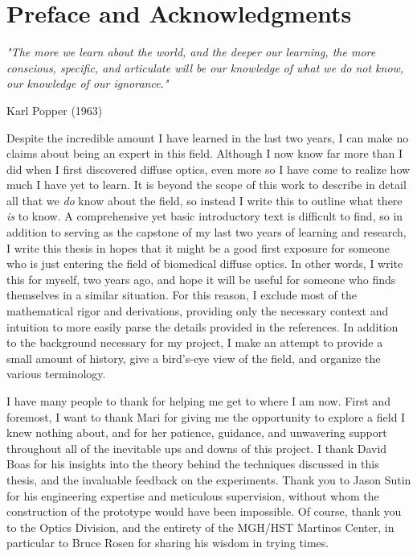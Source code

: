 \section*{Preface and Acknowledgments}

\epigraph{\textit{"The more we learn about the world, and the deeper our learning, the more conscious, specific, and articulate will be our knowledge of what we do not know, our knowledge of our ignorance."}}{Karl Popper (1963)}

Despite the incredible amount I have learned in the last two years, I can make no claims about being an expert in this field. Although I now know far more than I did when I first discovered diffuse optics, even more so I have come to realize how much I have yet to learn. It is beyond the scope of this work to describe in detail all that we \emph{do} know about the field, so instead I write this to outline what there \emph{is} to know. A comprehensive yet basic introductory text is difficult to find, so in addition to serving as the capstone of my last two years of learning and research, I write this thesis in hopes that it might be a good first exposure for someone who is just entering the field of biomedical diffuse optics. In other words, I write this for myself, two years ago, and hope it will be useful for someone who finds themselves in a similar situation. For this reason, I exclude most of the mathematical rigor and derivations, providing only the necessary context and intuition to more easily parse the details provided in the references. In addition to the background necessary for my project, I make an attempt to provide a small amount of history, give a bird's-eye view of the field, and organize the various terminology.  


I have many people to thank for helping me get to where I am now. First and foremost, I want to thank Mari for giving me the opportunity to explore a field I knew nothing about, and for her patience, guidance, and unwavering support throughout all of the inevitable ups and downs of this project. I thank David Boas for his insights into the theory behind the techniques discussed in this thesis, and the invaluable feedback on the experiments. Thank you to Jason Sutin for his engineering expertise and meticulous supervision, without whom the construction of the prototype would have been impossible. Of course, thank you to the Optics Division, and the entirety of the MGH/HST Martinos Center, in particular to Bruce Rosen for sharing his wisdom in trying times.
 
